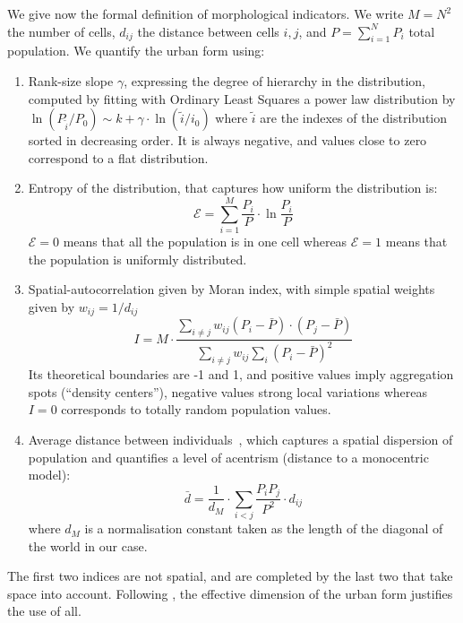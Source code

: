 \documentclass[10pt,letterpaper]{article}
\begin{document}
We give now the formal definition of morphological indicators. We write $M=N^2$ the number of cells, $d_{ij}$ the distance between cells $i,j$, and $P=\sum_{i=1}^{N} P_i$ total population. We quantify the urban form using:

\begin{enumerate}
\item Rank-size slope $\gamma$, expressing the degree of hierarchy in the distribution, computed by fitting with Ordinary Least Squares a power law distribution by $\ln \left( P_{\tilde{i}}/P_0\right) \sim k + \gamma\cdot \ln \left(\tilde{i}/i_0\right)$ where $\tilde{i}$ are the indexes of the distribution sorted in decreasing order. It is always negative, and values close to zero correspond to a flat distribution.
\item Entropy of the distribution, that captures how uniform the distribution is:
\begin{equation}
\mathcal{E} = \sum_{i=1}^{M}\frac{P_i}{P}\cdot \ln{\frac{P_i}{P}}
\end{equation}
$\mathcal{E}=0$ means that all the population is in one cell whereas $\mathcal{E}=1$ means that the population is uniformly distributed.
\item Spatial-autocorrelation given by Moran index, with simple spatial weights given by $w_{ij} = 1/d_{ij}$
\begin{equation}
I = M \cdot \frac{\sum_{i\neq j} w_{ij} \left(P_i - \bar{P}\right)\cdot\left(P_j - \bar{P}\right)}{\sum_{i\neq j} w_{ij} \sum_{i}{\left( P_i - \bar{P}\right)}^2}
\end{equation}
Its theoretical boundaries are -1 and 1, and positive values imply aggregation spots (``density centers''), negative values strong local variations whereas $I=0$ corresponds to totally random population values.
\item Average distance between individuals~\cite{le2009quantifier}, which captures a spatial dispersion of population and quantifies a level of acentrism (distance to a monocentric model):
\begin{equation}
\bar{d} = \frac{1}{d_M}\cdot \sum_{i<j} \frac{P_i P_j}{P^2} \cdot d_{ij}
\end{equation}
where $d_M$ is a normalisation constant taken as the length of the diagonal of the world in our case.
\end{enumerate}


The first two indices are not spatial, and are completed by the last two that take space into account. Following \cite{Schwarz201029}, the effective dimension of the urban form justifies the use of all.
\end{document}
